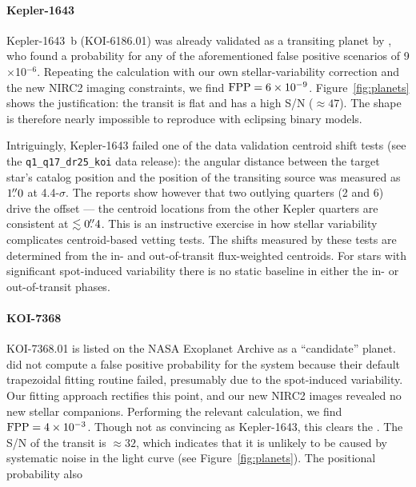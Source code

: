 \documentclass[12pt,twocolumn,tighten,linenumbers,trackchanges]{aastex63}
\begin{document}
\paragraph{Kepler-1643}
Kepler-1643~b (KOI-6186.01) was already validated as a transiting
planet by \citet{morton_false_2016}, who found a probability for any
of the aforementioned false positive scenarios of 9$\times$10$^{-6}$.
Repeating the calculation with our own stellar-variability correction
and the new NIRC2 imaging constraints, we find ${\rm FPP} =
6\times10^{-9}$.  Figure~\ref{fig:planets} shows the justification:
the transit is flat and has a high S/N ($\approx$$47$).  The shape is
therefore nearly impossible to reproduce with eclipsing binary models.

Intriguingly, Kepler-1643 failed one of the data validation
centroid shift tests (see the \texttt{q1\_q17\_dr25\_koi} data
release): the angular distance between the target star's catalog
position and the position of the transiting source was measured as
$1\mbox{$.\!\!^{\prime\prime}$}0$ at 4.4-$\sigma$.  The reports show however that two
outlying quarters (2 and 6) drive the offset --- the centroid locations
from the other Kepler quarters are consistent at $\lesssim 0\mbox{$.\!\!^{\prime\prime}$}4$.
This is an instructive exercise in how stellar
variability complicates centroid-based vetting tests.  The 
shifts measured by these tests are determined from the in- and
out-of-transit flux-weighted centroids.  For stars with significant
spot-induced variability there is no static baseline in either the in-
or out-of-transit phases.

\paragraph{KOI-7368}
KOI-7368.01 is listed on the NASA Exoplanet Archive as a ``candidate''
planet.  \citet{morton_false_2016} did not compute a false positive
probability for the system because their default trapezoidal fitting
routine failed, presumably due to the spot-induced variability.  Our
fitting approach rectifies this point, and our new NIRC2 images
revealed no new stellar companions.  Performing the relevant
calculation, we find ${\rm FPP} = 4\times10^{-3}$.  Though not
as convincing as Kepler-1643, this clears the .  The S/N of the transit is
$\approx$$32$, which indicates that it is unlikely to be caused by
systematic noise in the light curve (see Figure~\ref{fig:planets}).
The positional probability also 
\end{document}
